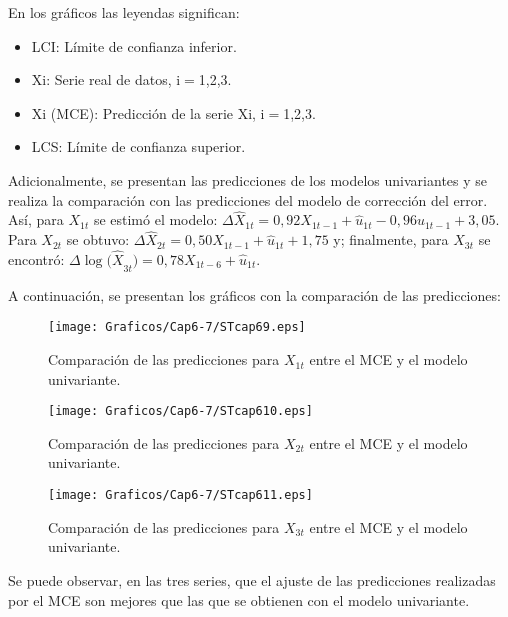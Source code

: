 En los gr\'{a}ficos las leyendas significan:
\begin{itemize}
      \item LCI: L\'{i}mite de confianza inferior.
      \item Xi: Serie real de datos, i$=$1,2,3.
      \item Xi (MCE): Predicci\'{o}n de la serie Xi, i$=$1,2,3.
      \item LCS: L\'{i}mite de confianza superior.
\end{itemize}

Adicionalmente, se presentan las predicciones de los modelos univariantes y se realiza la comparaci\'{o}n con las predicciones del modelo de 
correcci\'{o}n del error. As\'{i}, para $X_{1t}$ se estim\'{o} el modelo: ${\Delta \hat{X}}_{1t}=0,92X_{1t-1}+\hat{u}_{1t}-0,96u_{1t-1}+3,05$. Para 
$X_{2t}$ se obtuvo: ${\Delta \hat{X}}_{2t}=0,50X_{1t-1}+\hat{u}_{1t}+1,75$ y; finalmente, para $X_{3t}$ se encontr\'{o}: ${\Delta \log (\hat{X}}_{3t})=0,78X_{1t-6}+\hat{u}_{1t}$.

A continuaci\'{o}n, se presentan los gr\'{a}ficos con la comparaci\'{o}n de las predicciones:

\begin{figure}[H]
\centering
\texttt{[image: Graficos/Cap6-7/STcap69.eps]}
\caption{Comparaci\'{o}n de las predicciones para $X_{1t}$ entre el MCE y el modelo univariante.}
\end{figure}

\begin{figure}[H]
\centering
\texttt{[image: Graficos/Cap6-7/STcap610.eps]}
\caption{Comparaci\'{o}n de las predicciones para $X_{2t}$ entre el MCE y el modelo univariante.}
\end{figure}

\begin{figure}[H]
\centering
\texttt{[image: Graficos/Cap6-7/STcap611.eps]}
\caption{Comparaci\'{o}n de las predicciones para $X_{3t}$ entre el MCE y el modelo univariante.}
\end{figure}


Se puede observar, en las tres series, que el ajuste de las predicciones realizadas por el MCE son mejores que las que se obtienen con el modelo univariante.

